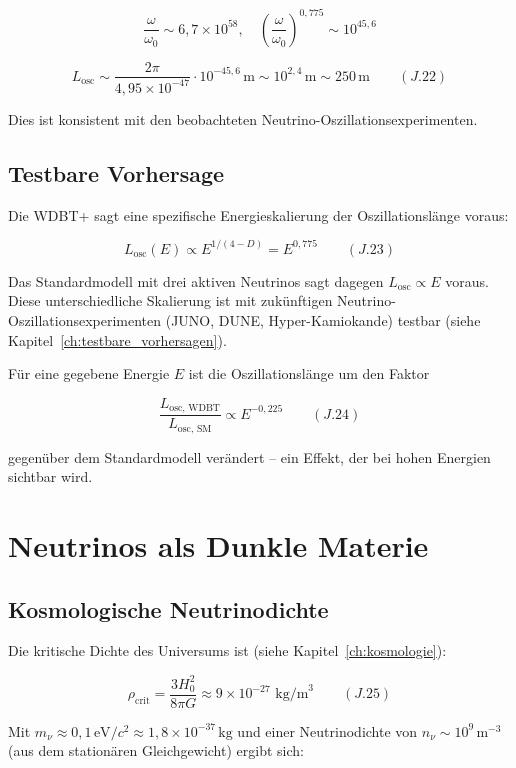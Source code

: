 \[
\frac{\omega}{\omega_0} \sim 6{,}7 \times 10^{58}, \quad 
\left( \frac{\omega}{\omega_0} \right)^{0,775} \sim 10^{45,6}
\]

\[
L_{\text{osc}} \sim \frac{2\pi}{4{,}95 \times 10^{-47}} \cdot 10^{-45,6} \, \text{m} 
\sim 10^{2,4} \, \text{m} \sim 250 \, \text{m} \qquad (J.22)
\]

Dies ist konsistent mit den beobachteten Neutrino-Oszillationsexperimenten.

\subsection{Testbare Vorhersage}
\label{sub:neutrino_oszillation_vorhersage}

Die WDBT+ sagt eine spezifische Energieskalierung der Oszillationslänge voraus:

\[
\boxed{L_{\text{osc}}(E) \propto E^{1/(4-D)} = E^{0,775}} \qquad (J.23)
\]

Das Standardmodell mit drei aktiven Neutrinos sagt dagegen \( L_{\text{osc}} \propto E \) voraus. Diese unterschiedliche Skalierung ist mit zukünftigen Neutrino-Oszillationsexperimenten (JUNO, DUNE, Hyper-Kamiokande) testbar (siehe Kapitel~\ref{ch:testbare_vorhersagen}).

Für eine gegebene Energie \( E \) ist die Oszillationslänge um den Faktor

\[
\frac{L_{\text{osc, WDBT}}}{L_{\text{osc, SM}}} \propto E^{-0,225} \qquad (J.24)
\]

gegenüber dem Standardmodell verändert – ein Effekt, der bei hohen Energien sichtbar wird.

\section{Neutrinos als Dunkle Materie}
\label{app:neutrino_oszillation_dunkle_materie}

\subsection{Kosmologische Neutrinodichte}
\label{sub:neutrino_oszillation_dichte}

Die kritische Dichte des Universums ist (siehe Kapitel~\ref{ch:kosmologie}):

\[
\rho_{\text{crit}} = \frac{3H_0^2}{8\pi G} \approx 9 \times 10^{-27} \text{ kg/m}^3 \qquad (J.25)
\]

Mit \( m_{\nu} \approx 0{,}1\,\text{eV}/c^2 \approx 1{,}8 \times 10^{-37}\,\text{kg} \) und einer Neutrinodichte von \( n_{\nu} \sim 10^9\,\text{m}^{-3} \) (aus dem stationären Gleichgewicht) ergibt sich:

